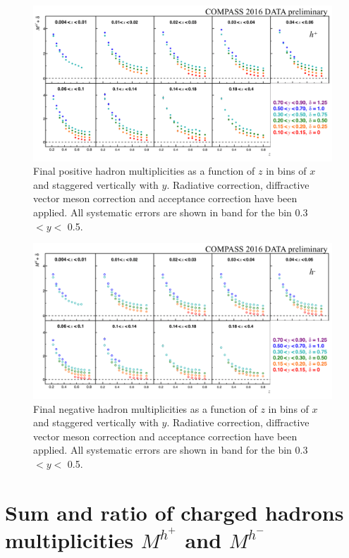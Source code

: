 \documentclass[letterpaper,12pt]{article}
\begin{document}
\begin{figure}
	\includegraphics[scale=0.5]{./gfx/hp.png}
	\caption{Final positive hadron multiplicities as a function of $z$ in bins of $x$ and staggered vertically with $y$. Radiative correction, diffractive vector meson correction and acceptance correction have been applied. All systematic errors are shown in band for the bin 0.3 $< y <$ 0.5.}
	\label{hp}
\end{figure}

\begin{figure}
	\includegraphics[scale=0.5]{./gfx/hm.png}
	\caption{Final negative hadron multiplicities as a function of $z$ in bins of $x$ and staggered vertically with $y$. Radiative correction, diffractive vector meson correction and acceptance correction have been applied. All systematic errors are shown in band for the bin 0.3 $< y <$ 0.5.}
	\label{hm}
\end{figure}

\newpage

\section{Sum and ratio of charged hadrons multiplicities $M^{h^+}$ and $M^{h^-}$} \label{MSR}
\end{document}
